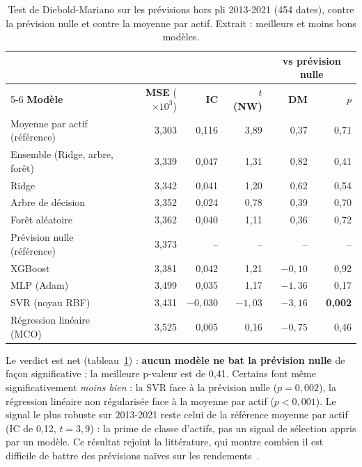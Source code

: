 \begin{table}[!htb]
  \centering
  \small
  \caption{Test de Diebold-Mariano sur les prévisions hors pli 2013-2021 (454 dates), contre la prévision nulle et contre la moyenne par actif. Extrait : meilleurs et moins bons modèles.}
  \label{tab:dm}
  \begin{tabular}{@{}l r r r r r@{}}
    \toprule
     & & & & \multicolumn{2}{c}{\textbf{vs prévision nulle}} \\
    \cmidrule(l){5-6}
    \textbf{Modèle} & \textbf{MSE} ($\times 10^{3}$) & \textbf{IC} & \textbf{$t$ (NW)} & \textbf{DM} & \textbf{$p$} \\
    \midrule
    Moyenne par actif (référence) & 3,303 & 0,116 & 3,89 & 0,37 & 0,71 \\
    Ensemble (Ridge, arbre, forêt) & 3,339 & 0,047 & 1,31 & 0,82 & 0,41 \\
    Ridge & 3,342 & 0,041 & 1,20 & 0,62 & 0,54 \\
    Arbre de décision & 3,352 & 0,024 & 0,78 & 0,39 & 0,70 \\
    Forêt aléatoire & 3,362 & 0,040 & 1,11 & 0,36 & 0,72 \\
    Prévision nulle (référence) & 3,373 & -- & -- & -- & -- \\
    XGBoost & 3,381 & 0,042 & 1,21 & $-0{,}10$ & 0,92 \\
    MLP (Adam) & 3,499 & 0,035 & 1,17 & $-1{,}36$ & 0,17 \\
    SVR (noyau RBF) & 3,431 & $-0{,}030$ & $-1{,}03$ & $-3{,}16$ & \textbf{0,002} \\
    Régression linéaire (MCO) & 3,525 & 0,005 & 0,16 & $-0{,}75$ & 0,46 \\
    \bottomrule
  \end{tabular}
\end{table}

Le verdict est net (tableau~\ref{tab:dm}) : \textbf{aucun modèle ne bat la prévision nulle} de façon significative ; la meilleure p-valeur est de 0,41. Certains font même significativement \emph{moins bien} : la SVR face à la prévision nulle ($p = 0{,}002$), la régression linéaire non régularisée face à la moyenne par actif ($p < 0{,}001$). Le signal le plus robuste sur 2013-2021 reste celui de la référence \og moyenne par actif \fg{} (IC de 0,12, $t = 3{,}9$) : la prime de classe d'actifs, pas un signal de sélection appris par un modèle. Ce résultat rejoint la littérature, qui montre combien il est difficile de battre des prévisions naïves sur les rendements~\cite{welch2008,gu2020}.

